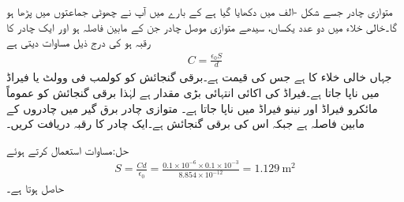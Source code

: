 
متوازی چادر  جسے شکل -الف میں دکھایا گیا ہے کے بارے میں آپ نے چھوٹی جماعتوں میں پڑھا ہو گا۔خالی خلاء میں دو عدد یکساں، سیدھے متوازی موصل چادر جن کے مابین فاصلہ  ہو اور  ایک چادر کا رقبہ  ہو کی   درج ذیل مساوات دیتی ہے
\begin{align}\label{مساوات_امالہ_تعریف_مساوات}
C=\frac{\epsilon_0 S}{d}
\end{align}
جہاں  خالی خلاء کا  ہے جس کی قیمت  ہے۔برقی گنجائش کو کولمب فی وولٹ  یا فیراڈ  میں ناپا جاتا ہے۔فیراڈ کی اکائی انتہائی بڑی مقدار ہے  لہٰذا برقی گنجائش کو عموماً مائکرو فیراڈ  اور نینو فیراڈ  میں ناپا جاتا ہے۔
متوازی چادر برق گیر میں چادروں کے مابین فاصلہ  ہے جبکہ اس کی برقی گنجائش  ہے۔ایک چادر کا رقبہ دریافت کریں۔

حل:مساوات  استعمال کرتے ہوئے
\begin{align*}
S=\frac{C d}{\epsilon_0}=\frac{0.1\times 10^{-6} \times 0.1\times 10^{-3}}{8.854\times 10^{-12}}=\SI{1.129}{\meter\squared}
\end{align*}
حاصل ہوتا ہے۔

